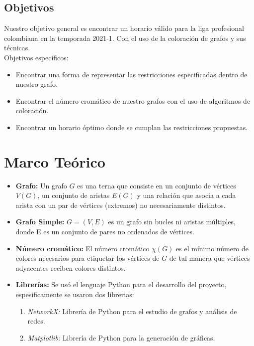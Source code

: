 \documentclass[11pt]{article}
\begin{document}
\begin{multicols}{2}
            \subsection{Objetivos}
                Nuestro objetivo general es encontrar un horario válido para la liga profesional colombiana en la temporada 2021-1. Con el uso de la coloración 
                de grafos y sus técnicas.\\[10pt]
                Objetivos específicos:
                \begin{itemize}
                    \item Encontrar una forma de representar las restricciones especificadas dentro de nuestro grafo. 
                    \item Encontrar el número cromático de nuestro grafos con el uso de algoritmos de coloración.
                    \item Encontrar un horario óptimo donde se cumplan las restricciones propuestas.
                \end{itemize}

        \section{Marco Teórico}

            \begin{itemize}
                \item \textbf{Grafo:} Un grafo $G$ es una terna que consiste en un conjunto de vértices $V(G)$, un conjunto 
                de aristas $E(G)$ y una relación que asocia a cada arista con un par de vértices (extremos) 
                no necesariamente distintos.
                \item \textbf{Grafo Simple:} $G = (V,E)$ es un grafo sin bucles ni aristas múltiples, donde E es un conjunto 
                de pares no ordenados de vértices.
                \item \textbf{Número cromático:} El número cromático $\chi(G)$ es el mínimo número de colores necesarios 
                para etiquetar los vértices de $G$ de tal manera que vértices adyacentes reciben colores 
                distintos.  
                \item \textbf{Librerías:} Se usó el lenguaje Python para el desarrollo del proyecto, espesificamente se usaron dos librerias:
                \begin{enumerate}
                    \item \textit{NetworkX:} Librería de Python para el estudio de grafos y análisis de redes.
                    \item \textit{Matplotlib:} Librería de Python para la generación de gráficas.
                \end{enumerate}        
            \end{itemize}
        

\end{multicols}
\end{document}
